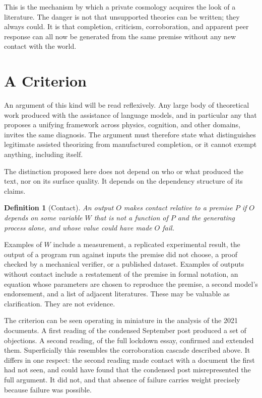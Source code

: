 \documentclass[11pt]{article}
\newtheorem{definition}{Definition}
\begin{document}
This is the mechanism by which a private cosmology acquires the look of a literature. The danger is not that unsupported theories can be written; they always could. It is that completion, criticism, corroboration, and apparent peer response can all now be generated from the same premise without any new contact with the world.

\section{A Criterion}

An argument of this kind will be read reflexively. Any large body of theoretical work produced with the assistance of language models, and in particular any that proposes a unifying framework across physics, cognition, and other domains, invites the same diagnosis. The argument must therefore state what distinguishes legitimate assisted theorizing from manufactured completion, or it cannot exempt anything, including itself.

The distinction proposed here does not depend on who or what produced the text, nor on its surface quality. It depends on the dependency structure of its claims.

\begin{definition}[Contact]
An output $O$ makes \emph{contact} relative to a premise $P$ if $O$ depends on some variable $W$ that is not a function of $P$ and the generating process alone, and whose value could have made $O$ fail.
\end{definition}

Examples of $W$ include a measurement, a replicated experimental result, the output of a program run against inputs the premise did not choose, a proof checked by a mechanical verifier, or a published dataset. Examples of outputs without contact include a restatement of the premise in formal notation, an equation whose parameters are chosen to reproduce the premise, a second model's endorsement, and a list of adjacent literatures. These may be valuable as clarification. They are not evidence.

The criterion can be seen operating in miniature in the analysis of the 2021 documents. A first reading of the condensed September post produced a set of objections. A second reading, of the full lockdown essay, confirmed and extended them. Superficially this resembles the corroboration cascade described above. It differs in one respect: the second reading made contact with a document the first had not seen, and could have found that the condensed post misrepresented the full argument. It did not, and that absence of failure carries weight precisely because failure was possible.
\end{document}
